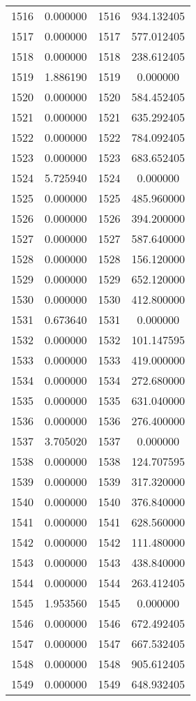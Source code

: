 \documentclass[12pt]{article}
\begin{document}
\begin{longtable}{@{}cccc@{}}
1516 & 0.000000 & 1516 & 934.132405 \\
1517 & 0.000000 & 1517 & 577.012405 \\
1518 & 0.000000 & 1518 & 238.612405 \\
1519 & 1.886190 & 1519 & 0.000000 \\
1520 & 0.000000 & 1520 & 584.452405 \\
1521 & 0.000000 & 1521 & 635.292405 \\
1522 & 0.000000 & 1522 & 784.092405 \\
1523 & 0.000000 & 1523 & 683.652405 \\
1524 & 5.725940 & 1524 & 0.000000 \\
1525 & 0.000000 & 1525 & 485.960000 \\
1526 & 0.000000 & 1526 & 394.200000 \\
1527 & 0.000000 & 1527 & 587.640000 \\
1528 & 0.000000 & 1528 & 156.120000 \\
1529 & 0.000000 & 1529 & 652.120000 \\
1530 & 0.000000 & 1530 & 412.800000 \\
1531 & 0.673640 & 1531 & 0.000000 \\
1532 & 0.000000 & 1532 & 101.147595 \\
1533 & 0.000000 & 1533 & 419.000000 \\
1534 & 0.000000 & 1534 & 272.680000 \\
1535 & 0.000000 & 1535 & 631.040000 \\
1536 & 0.000000 & 1536 & 276.400000 \\
1537 & 3.705020 & 1537 & 0.000000 \\
1538 & 0.000000 & 1538 & 124.707595 \\
1539 & 0.000000 & 1539 & 317.320000 \\
1540 & 0.000000 & 1540 & 376.840000 \\
1541 & 0.000000 & 1541 & 628.560000 \\
1542 & 0.000000 & 1542 & 111.480000 \\
1543 & 0.000000 & 1543 & 438.840000 \\
1544 & 0.000000 & 1544 & 263.412405 \\
1545 & 1.953560 & 1545 & 0.000000 \\
1546 & 0.000000 & 1546 & 672.492405 \\
1547 & 0.000000 & 1547 & 667.532405 \\
1548 & 0.000000 & 1548 & 905.612405 \\
1549 & 0.000000 & 1549 & 648.932405 \\

\end{longtable}
\end{document}

